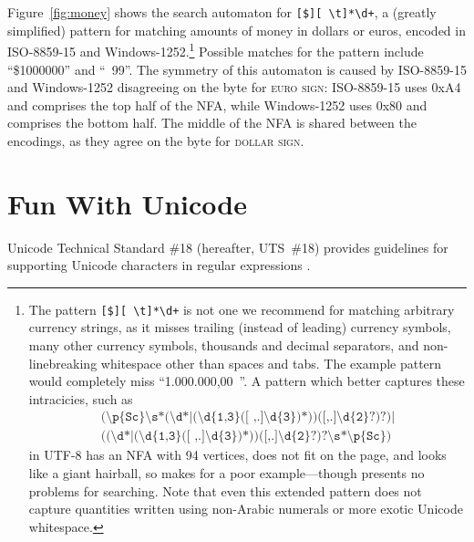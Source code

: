\documentclass[5p,final,number,sort&compress]{elsarticle}
\newcommand{\re}[1]{\texttt{#1}}
\newcommand*{\whack}{\textbackslash}
\begin{document}
Figure~\ref{fig:money} shows the search automaton for \re{[\texteuro\$][ \whack t]*\whack d+}, a (greatly simplified) pattern for matching amounts of money in dollars or euros, encoded in ISO-8859-15 and Windows-1252.\footnote{The pattern \re{[\texteuro\$][ \whack t]*\whack d+} is not one we recommend for matching arbitrary currency strings, as it misses trailing (instead of leading) currency symbols, many other currency symbols, thousands and decimal separators, and non-linebreaking whitespace other than spaces and tabs. The example pattern would completely miss ``1.000.000,00~\texteuro''. A pattern which better captures these intracicies, such as
\begin{multline*}
  \re{(\whack p\{Sc\}\whack s*(\whack d*|(\whack d\{1,3\}([~,.]\whack d\{3\})*))([,.]\whack d\{2\}?)?)|}
\\
\re{((\whack d*|(\whack d\{1,3\}([~,.]\whack d\{3\})*))([,.]\whack d\{2\}?)?\whack s*\whack p\{Sc\})}
\end{multline*}
in UTF-8 has an NFA with 94 vertices, does not fit on the page, and looks like a giant hairball, so makes for a poor example---though presents no problems for searching. Note that even this extended pattern does not capture quantities written using non-Arabic numerals or more exotic Unicode whitespace.} Possible matches for the pattern include ``\$1000000'' and ``\texteuro\ 99''. The symmetry of this automaton is caused by ISO-8859-15 and Windows-1252 disagreeing on the byte for \textsc{euro sign}: ISO-8859-15 uses 0xA4 and comprises the top half of the NFA, while Windows-1252 uses 0x80 and comprises the bottom half. The middle of the NFA is shared between the encodings, as they agree on the byte for \textsc{dollar sign}.

\section{Fun With Unicode}

Unicode Technical Standard \#18 (hereafter, UTS~\#18) provides guidelines for supporting Unicode characters in regular expressions \citep{uts18}.

\end{document}

